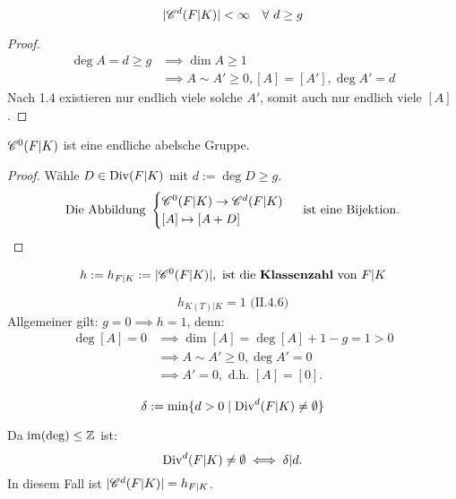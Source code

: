 \begin{lemma}
    $$|\mathscr{C}^d(F|K)| < \infty \quad \forall~d \geq g$$
\end{lemma}
\begin{proof}
    \begin{align*}
        \deg A = d \geq g  & \implies \dim A \geq 1\\
        & \implies A \sim A' \geq 0, [A] = [A'], \deg A' = d
    \end{align*}
    Nach 1.4 existieren nur endlich viele solche $A'$, somit auch nur endlich viele $[A]$.
\end{proof}

\begin{satz}
    $\mathscr{C}^0(F|K)$ ist eine endliche abelsche Gruppe.
\end{satz}
\begin{proof}
    Wähle $D \in \operatorname{Div}(F|K)$ mit $d:=\deg D \geq g$.
    $$ \text{Die Abbildung } \begin{cases}
        \mathscr{C}^0(F|K) \to \mathscr{C}^d(F|K)\\
        [A] \mapsto [A +D]
    \end{cases} \text{ ist eine Bijektion.}$$
\end{proof}

\begin{definition}
    \begin{align*}
        h := h_{F|K} := |\mathscr{C}^0(F|K)|, \text{ ist die \textbf{Klassenzahl} von } F|K
    \end{align*}
\end{definition}

\begin{beispiel}
    $$ h_{K(T)|K} = 1 \text{ (II.4.6)}$$
    Allgemeiner gilt: $g=0 \implies h = 1$, denn:
    \begin{align*}
        \deg [A] = 0 & \implies \dim [A] = \deg [A] + 1 -g = 1 > 0 \\
        & \implies A \sim A' \geq 0, \deg A' = 0 \\
        & \implies A' = 0, \text{ d.h. } [A] = [0].
    \end{align*}
\end{beispiel}

\begin{definition}
    $$ \delta := \min\{d > 0 \mid \operatorname{Div}^d(F|K) \ne \emptyset\}$$
\end{definition}

\begin{bemerkungnr}
    Da $\operatorname{im}(\deg) \leq \mathbb{Z}$ ist:
    $$ \operatorname{Div}^d(F|K) \ne \emptyset \iff \delta|d.$$
    In diesem Fall ist $|\mathscr{C}^d(F|K)|=h_{F|K}$.    
\end{bemerkungnr}

